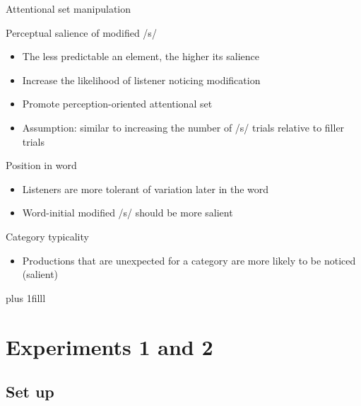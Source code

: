 \documentclass{beamer}
\newcommand{\btVFill}{\vskip0pt plus 1filll}
\begin{document}
\begin{frame}{Attentional set manipulation}

Perceptual salience of modified /s/
\begin{itemize}
\item The less predictable an element, the higher its salience
\item Increase the likelihood of listener noticing modification
\item Promote perception-oriented attentional set
\item Assumption: similar to increasing the number of /s/ trials relative to filler trials
\end{itemize}

Position in word
\begin{itemize}
\item Listeners are more tolerant of variation later in the word
\item Word-initial modified /s/ should be more salient 
\end{itemize}

Category typicality
\begin{itemize}
\item Productions that are unexpected for a category are more likely to be noticed (salient)
\end{itemize}

\btVFill
\begin{flushright}
\scriptsize
\citet{Pitt2012}
\end{flushright}
\end{frame}

\section{Experiments 1 and 2}

\subsection{Set up}
\end{document}
